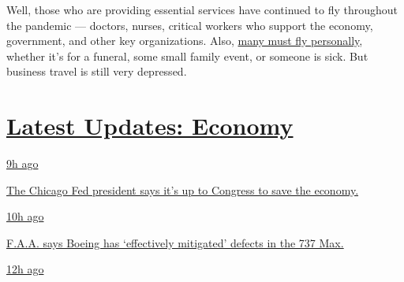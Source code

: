 Well, those who are providing essential services have continued to fly
throughout the pandemic --- doctors, nurses, critical workers who
support the economy, government, and other key organizations. Also,
\href{https://www.nytimes.com/2020/06/09/business/flying-coronovirus.html}{many
must fly personally}, whether it's for a funeral, some small family
event, or someone is sick. But business travel is still very depressed.

\hypertarget{latest-updates-economy}{%
\section{\texorpdfstring{\href{https://www.nytimes.com/live/2020/08/03/business/stock-market-today-coronavirus?action=click\&pgtype=Article\&state=default\&region=MAIN_CONTENT_1\&context=storylines_live_updates}{Latest
Updates:
Economy}}{Latest Updates: Economy}}\label{latest-updates-economy}}

\href{https://www.nytimes.com/live/2020/08/03/business/stock-market-today-coronavirus?action=click\&pgtype=Article\&state=default\&region=MAIN_CONTENT_1\&context=storylines_live_updates\#the-chicago-fed-president-says-its-up-to-congress-to-save-the-economy}{9h
ago}

\href{https://www.nytimes.com/live/2020/08/03/business/stock-market-today-coronavirus?action=click\&pgtype=Article\&state=default\&region=MAIN_CONTENT_1\&context=storylines_live_updates\#the-chicago-fed-president-says-its-up-to-congress-to-save-the-economy}{The
Chicago Fed president says it's up to Congress to save the economy.}

\href{https://www.nytimes.com/live/2020/08/03/business/stock-market-today-coronavirus?action=click\&pgtype=Article\&state=default\&region=MAIN_CONTENT_1\&context=storylines_live_updates\#faa-says-boeing-has-effectively-mitigated-defects-in-the-737-max}{10h
ago}

\href{https://www.nytimes.com/live/2020/08/03/business/stock-market-today-coronavirus?action=click\&pgtype=Article\&state=default\&region=MAIN_CONTENT_1\&context=storylines_live_updates\#faa-says-boeing-has-effectively-mitigated-defects-in-the-737-max}{F.A.A.
says Boeing has `effectively mitigated' defects in the 737 Max.}

\href{https://www.nytimes.com/live/2020/08/03/business/stock-market-today-coronavirus?action=click\&pgtype=Article\&state=default\&region=MAIN_CONTENT_1\&context=storylines_live_updates\#small-businesses-got-emergency-loans-but-not-what-they-expected}{12h
ago}

